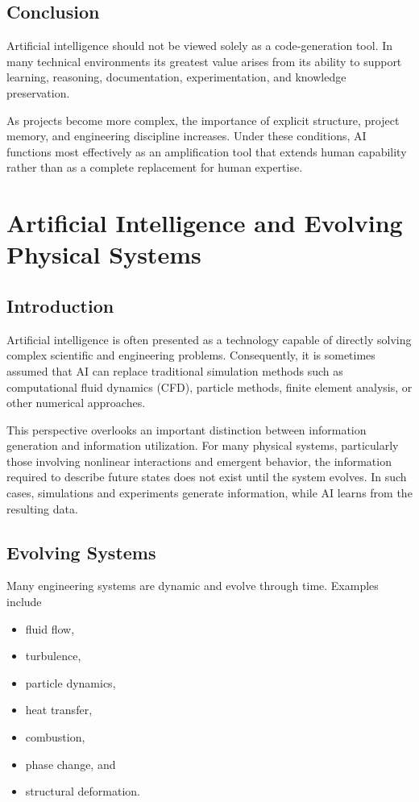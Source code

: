 \documentclass[11pt]{article}
\begin{document}
\subsection{Conclusion}

Artificial intelligence should not be viewed solely as a code-generation
tool. In many technical environments its greatest value arises from its
ability to support learning, reasoning, documentation, experimentation,
and knowledge preservation.

As projects become more complex, the importance of explicit structure,
project memory, and engineering discipline increases. Under these
conditions, AI functions most effectively as an amplification tool that
extends human capability rather than as a complete replacement for human
expertise.

\section{Artificial Intelligence and Evolving Physical Systems}

\subsection{Introduction}

Artificial intelligence is often presented as a technology capable of
directly solving complex scientific and engineering problems.
Consequently, it is sometimes assumed that AI can replace traditional
simulation methods such as computational fluid dynamics (CFD), particle
methods, finite element analysis, or other numerical approaches.

This perspective overlooks an important distinction between information
generation and information utilization. For many physical systems,
particularly those involving nonlinear interactions and emergent
behavior, the information required to describe future states does not
exist until the system evolves. In such cases, simulations and
experiments generate information, while AI learns from the resulting
data.

\subsection{Evolving Systems}

Many engineering systems are dynamic and evolve through time. Examples
include

\begin{itemize}
\item fluid flow,
\item turbulence,
\item particle dynamics,
\item heat transfer,
\item combustion,
\item phase change, and
\item structural deformation.
\end{itemize}
\end{document}
